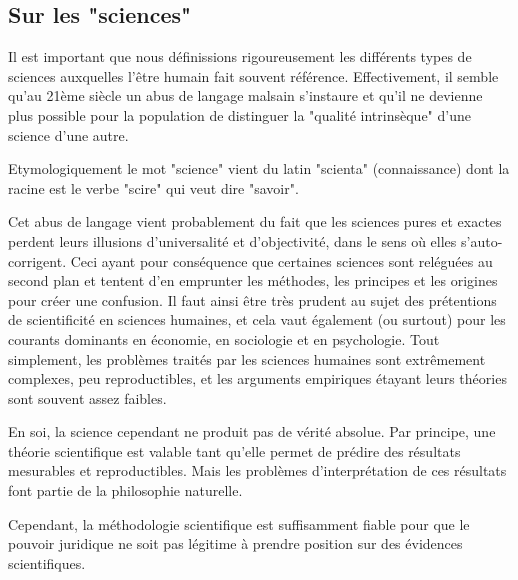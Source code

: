 	\subsection{Sur les "sciences"}	
	Il est important que nous définissions rigoureusement les différents types de sciences auxquelles l'être humain fait souvent référence. Effectivement, il semble qu'au 21ème siècle un abus de langage malsain s'instaure et qu'il ne devienne plus possible pour la population de distinguer la "qualité intrinsèque" d'une science d'une autre.

	\begin{tcolorbox}[title=Remark,colframe=black,arc=10pt]
	Etymologiquement le mot "science" vient du latin "scienta" (connaissance) dont la racine est le verbe "scire" qui veut dire "savoir".
	\end{tcolorbox}
	
	Cet abus de langage vient probablement du fait que les sciences pures et exactes perdent leurs illusions d'universalité et d'objectivité, dans le sens où elles s'auto-corrigent. Ceci ayant pour conséquence que certaines sciences sont reléguées au second plan et tentent d'en emprunter les méthodes, les principes et les origines pour créer une confusion. Il faut ainsi être très prudent au sujet des prétentions de scientificité en sciences humaines, et cela vaut également (ou surtout) pour les courants dominants en économie, en sociologie et en psychologie. Tout simplement, les problèmes traités par les sciences humaines sont extrêmement complexes, peu reproductibles, et les arguments empiriques étayant leurs théories sont souvent assez faibles.

	\marginnote{\textcolor{NavyBlue}{{\footnotesize \textbf{~\thechapter:\myparagraph}}}}En soi, la science cependant ne produit pas de vérité absolue. Par principe, une théorie scientifique est valable tant qu'elle permet de prédire des résultats mesurables et reproductibles. Mais les problèmes d'interprétation de ces résultats font partie de la philosophie naturelle.
	
	\begin{center}
	\end{center}
	Cependant, la méthodologie scientifique est suffisamment fiable pour que le pouvoir juridique ne soit pas légitime à prendre position sur des évidences scientifiques.


